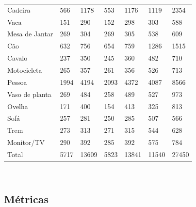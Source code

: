 \begin{table}[H]
\begin{tabular}{l|l|l|l|l|l|l}
		Cadeira        & 566          & 1178         & 553            & 1176          & 1119              & 2354              \\
		Vaca           & 151          & 290          & 152            & 298           & 303               & 588               \\
		Mesa de Jantar & 269          & 304          & 269            & 305           & 538               & 609               \\
		Cão            & 632          & 756          & 654            & 759           & 1286              & 1515              \\
		Cavalo         & 237          & 350          & 245            & 360           & 482               & 710               \\
		Motocicleta    & 265          & 357          & 261            & 356           & 526               & 713               \\
		Pessoa         & 1994         & 4194         & 2093           & 4372          & 4087              & 8566              \\
		Vaso de planta & 269          & 484          & 258            & 489           & 527               & 973               \\
		Ovelha         & 171          & 400          & 154            & 413           & 325               & 813               \\
		Sofá           & 257          & 281          & 250            & 285           & 507               & 566               \\
		Trem           & 273          & 313          & 271            & 315           & 544               & 628               \\
		Monitor/TV     & 290          & 392          & 285            & 392           & 575               & 784               \\
		Total          & 5717         & 13609        & 5823           & 13841         & 11540             & 27450            
	\end{tabular}
\\
\end{table}

\subsection{Métricas}
\label{section:3:4:2}

